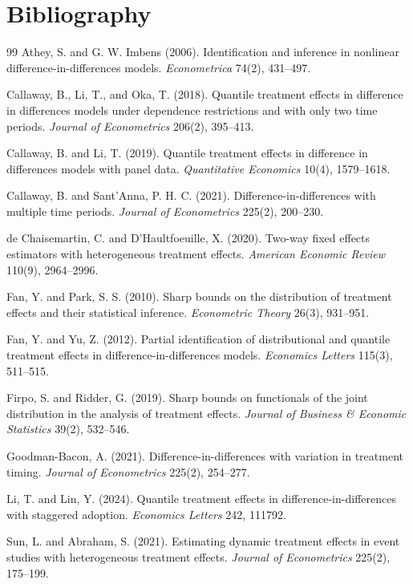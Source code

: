 \documentclass[11pt]{article}
\theoremstyle{definition}
\theoremstyle{plain}
\theoremstyle{remark}
\begin{document}
\section*{Bibliography}
\begin{thebibliography}{99}
Athey, S. and G. W. Imbens (2006).
\newblock Identification and inference in nonlinear difference-in-differences models.
\newblock \emph{Econometrica} 74(2), 431--497.

Callaway, B., Li, T., and Oka, T. (2018).
\newblock Quantile treatment effects in difference in differences models under dependence restrictions and with only two time periods.
\newblock \emph{Journal of Econometrics} 206(2), 395--413.

Callaway, B. and Li, T. (2019).
\newblock Quantile treatment effects in difference in differences models with panel data.
\newblock \emph{Quantitative Economics} 10(4), 1579--1618.

Callaway, B. and Sant'Anna, P. H. C. (2021).
\newblock Difference-in-differences with multiple time periods.
\newblock \emph{Journal of Econometrics} 225(2), 200--230.

de Chaisemartin, C. and D'Haultfoeuille, X. (2020).
\newblock Two-way fixed effects estimators with heterogeneous treatment effects.
\newblock \emph{American Economic Review} 110(9), 2964--2996.

Fan, Y. and Park, S. S. (2010).
\newblock Sharp bounds on the distribution of treatment effects and their statistical inference.
\newblock \emph{Econometric Theory} 26(3), 931--951.

Fan, Y. and Yu, Z. (2012).
\newblock Partial identification of distributional and quantile treatment effects in difference-in-differences models.
\newblock \emph{Economics Letters} 115(3), 511--515.

Firpo, S. and Ridder, G. (2019).
\newblock Sharp bounds on functionals of the joint distribution in the analysis of treatment effects.
\newblock \emph{Journal of Business \& Economic Statistics} 39(2), 532--546.

Goodman-Bacon, A. (2021).
\newblock Difference-in-differences with variation in treatment timing.
\newblock \emph{Journal of Econometrics} 225(2), 254--277.

Li, T. and Lin, Y. (2024).
\newblock Quantile treatment effects in difference-in-differences with staggered adoption.
\newblock \emph{Economics Letters} 242, 111792.

Sun, L. and Abraham, S. (2021).
\newblock Estimating dynamic treatment effects in event studies with heterogeneous treatment effects.
\newblock \emph{Journal of Econometrics} 225(2), 175--199.
\end{thebibliography}
\end{document}
